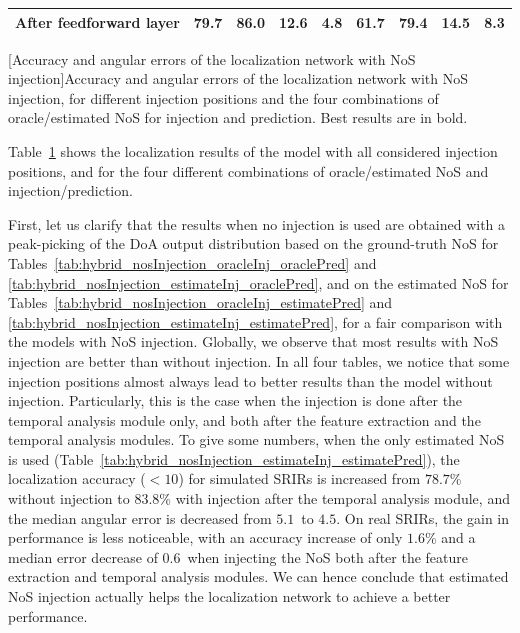 \begin{table}[t]
{\begin{adjustbox}{width=1.2\textwidth,center}
\begin{tabular}{|c|cccc|cccc|}
                After feedforward layer                        & 79.7                   & 86.0                   & 12.6                  & 4.8                    & 61.7                   & 79.4                   & 14.5                  & 8.3                     \\ \hline
            \end{tabular}
            \label{tab:hybrid_nosInjection_estimateInj_estimatePred}
        \end{adjustbox}
    }

    [Accuracy and angular errors of the localization network with NoS injection]{Accuracy and angular errors of the localization network with NoS injection, for different injection positions and the four combinations of oracle/estimated NoS for injection and prediction. Best results are in bold.}
    \label{tab:hybrid_nosInjection}
\end{table}

Table~\ref{tab:hybrid_nosInjection} shows the localization results of the model with all considered injection positions, and for the four different combinations of oracle/estimated NoS and injection/prediction. 

First, let us clarify that the results when no injection is used are obtained with a peak-picking of the DoA output distribution based on the ground-truth NoS for Tables~\ref{tab:hybrid_nosInjection_oracleInj_oraclePred} and \ref{tab:hybrid_nosInjection_estimateInj_oraclePred}, and on the estimated NoS for Tables~\ref{tab:hybrid_nosInjection_oracleInj_estimatePred} and \ref{tab:hybrid_nosInjection_estimateInj_estimatePred}, for a fair comparison with the models with NoS injection. Globally, we observe that most results with NoS injection are better than without injection. In all four tables, we notice that some injection positions almost always lead to better results than the model without injection. Particularly, this is the case when the injection is done after the temporal analysis module only, and both after the feature extraction and the temporal analysis modules. To give some numbers, when the only estimated NoS is used (Table~\ref{tab:hybrid_nosInjection_estimateInj_estimatePred}), the localization accuracy ($<10$\textdegree) for simulated SRIRs is increased from $78.7$\% without injection to $83.8$\% with injection after the temporal analysis module, and the median angular error is decreased from $5.1$\textdegree~to $4.5$\textdegree. On real SRIRs, the gain in performance is less noticeable, with an accuracy increase of only $1.6$\% and a median error decrease of $0.6$\textdegree~when injecting the NoS both after the feature extraction and temporal analysis modules. We can hence conclude that estimated NoS injection actually helps the localization network to achieve a better performance.


